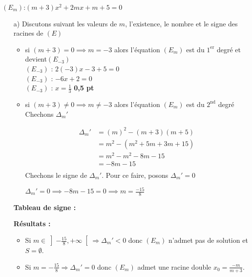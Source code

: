 \documentclass[12pt,a4paper]{article}
\begin{document}
\( (E_{m}) \):\( (m+3)x^{2} +2mx + m + 5 = 0\)
\begin{enumerate}

\item[a)] Discutons suivant les valeurs de \( m \), l’existence, le nombre et le signe des racines de \( (E) \) 

\begin{itemize}
\item si \( (m+3) = 0 \implies m = -3 \) alors l'équation \( (E_{m}) \) est du $1^{\text{er}}$ degré et devient\( (E_{-3}) \)\\
\( (E_{-3}) \) : \(  2(-3)x - 3 + 5 = 0\)\\
\( (E_{-3}) \) : \(  -6x +2 = 0\)\\
\( (E_{-3}) \) : \(  x = \frac{1}{3}\) \textbf{0,5 pt}
\item si \( (m+3) \neq 0 \implies m \neq -3 \) alors l'équation \( (E_{m}) \) est du $2^{\text{nd}}$ degré\\
Chechons \(\Delta_{m}'\)

\begin{align*}
\Delta_{m}'&=(m)^{2}-(m+3)(m+5)\\
					&=m^{2}-(m^{2}+5m+3m+15)\\
					&=m^{2}-m^{2}-8m-15\\
					&=-8m-15\\
\end{align*}
Chechons le signe de \(\Delta_{m}'\). Pour ce faire, posons \(\Delta_{m}'=0\)

\( \Delta_{m}'=0 \implies -8m-15=0 \implies m=\frac{-15}{8}\) 
\end{itemize}
\vspace{0.5cm}

\noindent \textbf{Tableau de signe :}


\vspace{0.5cm}

\noindent \textbf{Résultats :}

\begin{itemize}
    \item Si $m \in \left]-\frac{15}{8}, +\infty\right[ \Rightarrow \Delta_m' < 0$ donc $(E_m)$ n'admet pas de solution et $S = \emptyset$.
    \item Si $m = -\frac{15}{8} \Rightarrow \Delta_m' = 0$ donc $(E_m)$ admet une racine double $x_{0}=\frac{-m}{m+3}$.


\end{itemize}
\end{enumerate}
\end{document}
